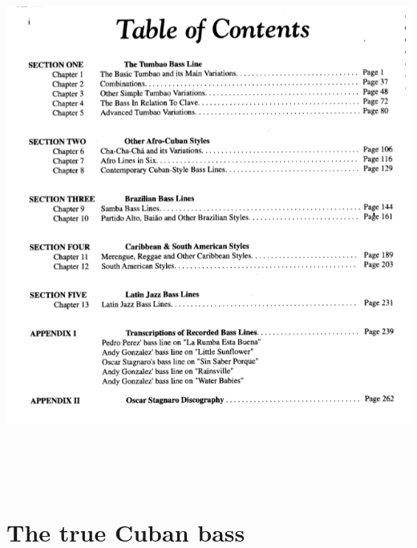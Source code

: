 \documentclass[a4paper]{book}
\begin{document}
\begin{center}
\includegraphics[width=17cm,height=17.577cm]{lebluessupportsmethodes-img174.png}
\end{center}
\clearpage\section{The true Cuban bass}
\end{document}
